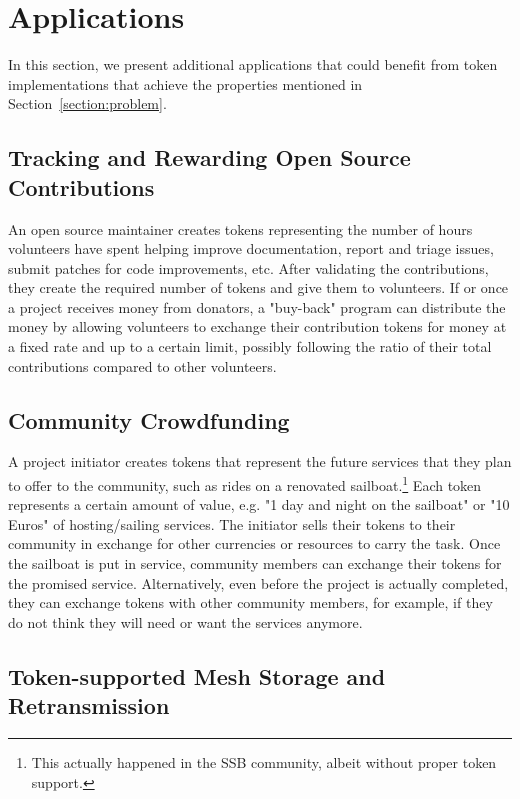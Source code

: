\documentclass[sigplan,screen,10pt]{acmart}
\begin{document}
\section{Applications}
\label{section:applications}

In this section, we present additional applications that could benefit from token implementations that achieve the properties mentioned in Section~\ref{section:problem}.

\subsection{Tracking and Rewarding Open Source Contributions}
\label{section:tracking-oss-contributions}

An open source maintainer creates tokens representing the number of hours volunteers have spent helping improve documentation, report and triage issues, submit patches for code improvements, etc. After validating the contributions, they create the required number of tokens and give them to volunteers. If or once a project receives money from donators, a "buy-back" program can distribute the money by allowing volunteers to exchange their contribution tokens for money at a fixed rate and up to a certain limit, possibly following the ratio of their total contributions compared to other volunteers.

\subsection{Community Crowdfunding}

A project initiator creates tokens that represent the future services that they plan to offer to the community, such as rides on a renovated sailboat.\footnote{This actually happened in the SSB community, albeit without proper token support.} Each token represents a certain amount of value, e.g. "1 day and night on the sailboat" or "10 Euros" of hosting/sailing services. The initiator sells their tokens to their community in exchange for other currencies or resources to carry the task. Once the sailboat is put in service, community members can exchange their tokens for the promised service. Alternatively, even before the project is actually completed, they can exchange tokens with other community members, for example, if they do not think they will need or want the services anymore.

\subsection{Token-supported Mesh Storage and Retransmission}
\end{document}

